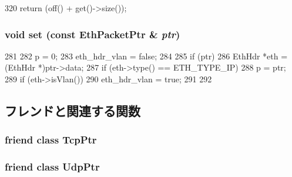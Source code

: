 \begin{DoxyCode}
320 { return (off() + get()->size()); }
\end{DoxyCode}
\hypertarget{classNet_1_1IpPtr_af1faec8f5ac9a74b80fa6ce84b17a7c6}{
\subsubsection[{set}]{\setlength{\rightskip}{0pt plus 5cm}void set (const {\bf EthPacketPtr} \& {\em ptr})}}
\label{classNet_1_1IpPtr_af1faec8f5ac9a74b80fa6ce84b17a7c6}



\begin{DoxyCode}
281     {
282         p = 0;
283         eth_hdr_vlan = false;
284 
285         if (ptr) {
286             EthHdr *eth = (EthHdr *)ptr->data;
287             if (eth->type() == ETH_TYPE_IP)
288                 p = ptr;
289             if (eth->isVlan())
290                 eth_hdr_vlan = true;
291         }
292     }
\end{DoxyCode}


\subsection{フレンドと関連する関数}
\hypertarget{classNet_1_1IpPtr_aaa26166329482f65ba88b88bb72b04ed}{
\subsubsection[{TcpPtr}]{\setlength{\rightskip}{0pt plus 5cm}friend class {\bf TcpPtr}}}
\label{classNet_1_1IpPtr_aaa26166329482f65ba88b88bb72b04ed}
\hypertarget{classNet_1_1IpPtr_ae00019f223a3b97d7f64791d15e438e5}{
\subsubsection[{UdpPtr}]{\setlength{\rightskip}{0pt plus 5cm}friend class {\bf UdpPtr}}}
\label{classNet_1_1IpPtr_ae00019f223a3b97d7f64791d15e438e5}


